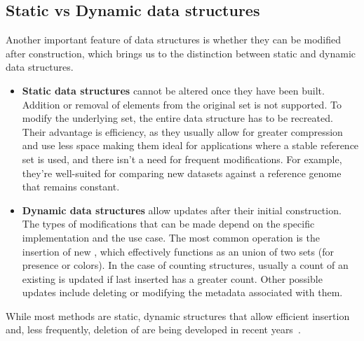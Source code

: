 \subsection{Static vs Dynamic data structures}
\label{sec:staticdynamic}
Another important feature of \kmer data structures is whether they can be modified after construction, which brings us to the distinction between static and dynamic data structures.\\
\begin{itemize}
	\item \textbf{Static data structures} cannot be altered once they have been built.  Addition or removal of elements from the original set is not supported. To modify the underlying set, the entire data structure has to be recreated. Their advantage is efficiency, as they usually allow for greater compression and use less space making them ideal for applications where a stable reference set is used, and there isn’t a need for frequent modifications. For example, they’re well-suited for comparing new datasets against a reference genome that remains constant.
	\item \textbf{Dynamic data structures} allow updates after their initial construction. The types of modifications that can be made depend on the specific implementation and the use case. The most common operation is the insertion of new \kmers, which effectively functions as an union of two sets (for presence or colors). In the case of counting structures, usually a count of an existing \kmer is updated if last inserted has a greater count. Other possible updates include deleting \kmers or modifying the metadata associated with them.
\end{itemize}
While most methods are static, dynamic structures that allow efficient insertion and, less frequently, deletion of \kmers are being developed in recent years~\cite{marchet2024kmersets}.

